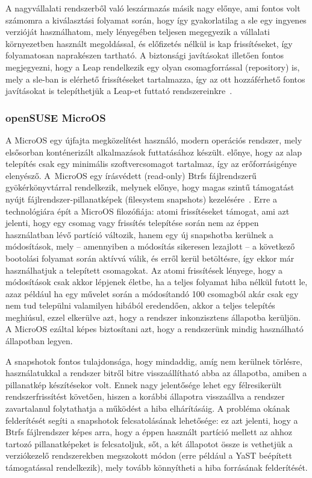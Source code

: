 A nagyvállalati rendszerből való leszármazás másik nagy előnye, ami fontos volt számomra a kiválasztási folyamat során, hogy így gyakorlatilag a \acrlong{sle} egy ingyenes verzióját használhatom, mely lényegében teljesen megegyezik a vállalati környezetben használt megoldással, és előfizetés nélkül is kap frissítéseket, így folyamatosan naprakészen tartható. A biztonsági javításokat illetően fontos megjegyezni, hogy a Leap rendelkezik egy olyan csomagforrással (repository) is, mely a \acrlong{sle}-ban is elérhető frissítéseket tartalmazza, így az ott hozzáférhető fontos javításokat is telepíthetjük a Leap-et futtató rendszereinkre~\cite{openSUSELeapSLERepo}.

\subsubsection{openSUSE MicroOS}
A MicroOS egy újfajta megközelítést használó, modern operációs rendszer, mely elsősorban konténerizált alkalmazások futtatásához készült.  előnye, hogy az alap telepítés csak egy minimális szoftvercsomagot tartalmaz, így az erőforrásigénye elenyésző. A~MicroOS egy írásvédett (read-only) Btrfs fájlrendszerű gyökérkönyvtárral rendelkezik, melynek előnye, hogy magas szintű támogatást nyújt fájlrendszer-pillanatképek (filesystem snapshots) kezelésére~\cite{BtrfsIntro}.
Erre a technológiára épít a MicroOS filozófiája: atomi frissítéseket támogat, ami azt jelenti, hogy egy csomag vagy frissítés telepítése során nem az éppen használatban lévő partíció változik, hanem egy új snapshotba kerülnek a módosítások, mely -- amennyiben a módosítás sikeresen lezajlott -- a következő bootolási folyamat során aktívvá válik, és  erről kerül betöltésre, így ekkor már használhatjuk a telepített csomagokat. Az atomi frissítések lényege, hogy a módosítások csak akkor lépjenek életbe, ha a teljes folyamat hiba nélkül futott le, azaz például ha egy művelet során a módosítandó 100 csomagból akár csak egy nem tud települni valamilyen hibából eredendően, akkor a teljes telepítés meghiúsul, ezzel elkerülve azt, hogy a rendszer inkonzisztens állapotba kerüljön. A MicroOS ezáltal képes biztosítani azt, hogy a rendszerünk mindig használható állapotban legyen.

A snapshotok fontos tulajdonsága, hogy mindaddig, amíg nem kerülnek törlésre, használatukkal a rendszer bitről bitre visszaállítható abba az állapotba, amiben a pillanatkép készítésekor volt. Ennek nagy jelentősége lehet egy félresikerült rendszerfrissítést követően, hiszen a korábbi állapotra visszaállva a rendszer zavartalanul folytathatja a működést a hiba elhárításáig.
A probléma okának felderítését segíti a snapshotok felcsatolásának lehetősége: ez azt jelenti, hogy a Btrfs fájlrendszer képes arra, hogy a éppen használt partíció mellett az ahhoz tartozó pillanatképeket is felcsatoljuk, sőt, a két állapotot össze is vethetjük a verziókezelő rendszerekben megszokott módon (erre például a YaST beépített támogatással rendelkezik), mely tovább könnyítheti a hiba forrásának felderítését.


